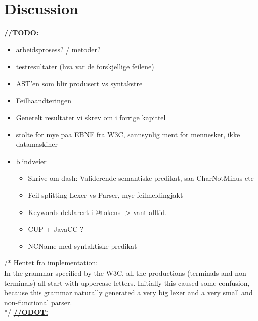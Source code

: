 \chapter{Discussion}

\underline{\textbf{\LARGE //TODO:}}

\begin{itemize}
\item arbeidsprosess? / metoder? 
\item testresultater (hva var de forskjellige feilene)
\item AST'en som blir produsert vs syntakstre
\item Feilhaandteringen
\item Generelt resultater vi skrev om i forrige kapittel
\item stolte for mye paa EBNF fra W3C, sannsynlig ment for mennesker, ikke datamaskiner
\item blindveier
	\begin{itemize}
	\item Skrive om dash: Validerende semantiske predikat, saa CharNotMinus etc
	\item Feil splitting Lexer vs Parser, mye feilmeldingjakt
	\item Keywords deklarert i @tokens -> vant alltid.
	\item CUP + JavaCC ?
	\item NCName med syntaktiske predikat
	\end{itemize}
\end{itemize}

/* Hentet fra implementation: \\
In the grammar specified by the W3C, all the productions (terminals and
non-terminals) all start with uppercase letters. Initially this caused some
confusion, because this grammar naturally generated a very big lexer and a very
small and non-functional parser. \\
*/
\underline{\textbf{\LARGE //ODOT:}}

